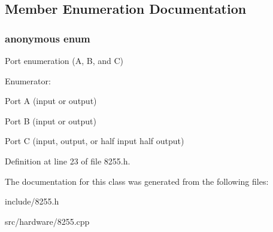 \subsection{Member Enumeration Documentation}
\hypertarget{classIntel8255_afad1dcdd07864ccadd09c33e1af473ed}{\subsubsection[{anonymous enum}]{\setlength{\rightskip}{0pt plus 5cm}anonymous enum}}\label{classIntel8255_afad1dcdd07864ccadd09c33e1af473ed}
Port enumeration (A, B, and C) \begin{Desc}
\item[Enumerator\-: ]\par
\begin{description}
\item[{\em 
\hypertarget{classIntel8255_afad1dcdd07864ccadd09c33e1af473eda37629392c4361095a45143d6093e0a71}{Port\-A}\label{classIntel8255_afad1dcdd07864ccadd09c33e1af473eda37629392c4361095a45143d6093e0a71}
}]Port A (input or output) \item[{\em 
\hypertarget{classIntel8255_afad1dcdd07864ccadd09c33e1af473eda480265dca14f2d4b03d6d0f6e9ae66f3}{Port\-B}\label{classIntel8255_afad1dcdd07864ccadd09c33e1af473eda480265dca14f2d4b03d6d0f6e9ae66f3}
}]Port B (input or output) \item[{\em 
\hypertarget{classIntel8255_afad1dcdd07864ccadd09c33e1af473edac42dfe5b4e1996f66b828cb26b79fb95}{Port\-C}\label{classIntel8255_afad1dcdd07864ccadd09c33e1af473edac42dfe5b4e1996f66b828cb26b79fb95}
}]Port C (input, output, or half input half output) \end{description}
\end{Desc}



Definition at line 23 of file 8255.\-h.



The documentation for this class was generated from the following files\-:\begin{DoxyCompactItemize}
\item 
include/8255.\-h\item 
src/hardware/8255.\-cpp\end{DoxyCompactItemize}
